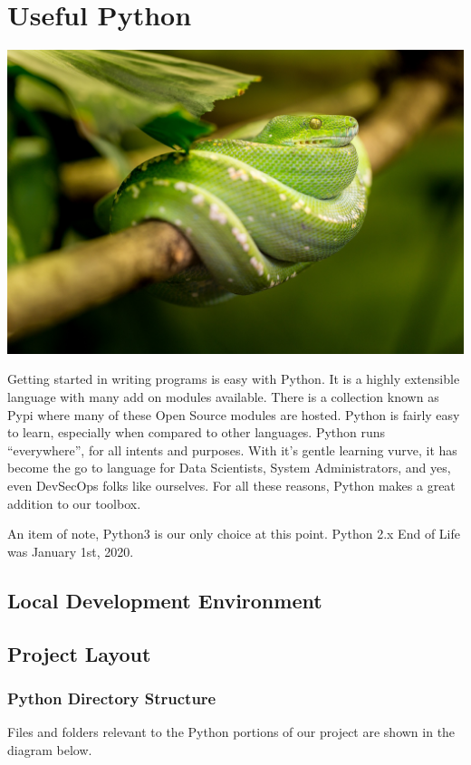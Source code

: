 \chapter{Useful Python}

\includegraphics[scale=0.85]{images/snake-1634293_1920.jpg}

\justifying
Getting started in writing programs is easy with Python. It is a highly extensible language with many add on modules available. 
There is a collection known as Pypi where many of these Open Source modules are hosted.
Python is fairly easy to learn, especially when compared to other languages. Python runs ``everywhere'', for all intents and
purposes. With it's gentle learning vurve, it has become the go to language for Data Scientists, System Administrators, and yes, even
DevSecOps folks like ourselves. For all these reasons, Python makes a great addition to our toolbox.

\justifying
An item of note, Python3 is our only choice at this point. Python 2.x End of Life was January 1st, 2020.

\section{Local Development Environment}


\section{Project Layout}

\subsection{Python Directory Structure}
\justifying
Files and folders relevant to the Python portions of our project are shown in the diagram below.

